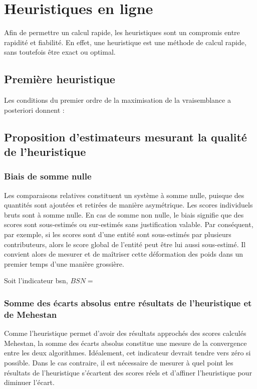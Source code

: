 \section{Heuristiques en ligne}
Afin de permettre un calcul rapide, les heuristiques sont un compromis entre rapidité et fiabilité. En effet, une heuristique est une méthode de calcul rapide, sans toutefois être exact ou optimal.

\subsection{Première heuristique}

Les conditions du premier ordre de la maximisation de la vraisemblance a posteriori donnent :


\subsection{Proposition d'estimateurs mesurant la qualité de l'heuristique}


\subsubsection{Biais de somme nulle}

Les comparaisons relatives constituent un système à somme nulle, puisque des quantités sont ajoutées et retirées de manière asymétrique. Les scores individuels bruts sont à somme nulle. En cas de somme non nulle, le biais signifie que des scores sont sous-estimés ou sur-estimés sans justification valable. Par conséquent, par exemple, si les scores sont d'une entité sont sous-estimés par plusieurs contributeurs, alors le score global de l'entité peut être lui aussi sous-estimé. Il convient alors de mesurer et de maîtriser cette déformation des poids dans un premier temps d'une manière grossière.

Soit l'indicateur \gls{bsn},
$BSN=$

\subsubsection{Somme des écarts absolus entre résultats de l'heuristique et de Mehestan}

Comme l'heuristique permet d'avoir des résultats approchés des scores calculés Mehestan, la somme des écarts absolus constitue une mesure de la convergence entre les deux algorithmes. Idéalement, cet indicateur devrait tendre vers zéro si possible. Dans le cas contraire, il est nécessaire de mesurer à quel point les résultats de l'heuristique s'écartent des scores réels et d'affiner l'heuristique pour diminuer l'écart.

